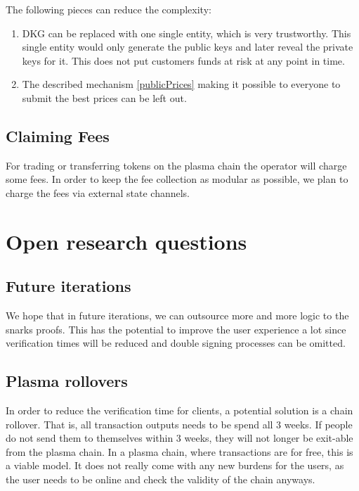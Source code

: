 \documentclass[11pt,parskip=full]{scrartcl}%
\begin{document}
The following pieces can reduce the complexity:
\begin{enumerate}
\item
DKG can be replaced with one single entity, which is very trustworthy. 
This single entity would only generate the public keys and later reveal the private keys for it. 
This does not put customers funds at risk at any point in time. 
\item
The described mechanism \ref{publicPrices} making it possible to everyone to submit the best prices can be left out. 
\end{enumerate}



\subsection{Claiming Fees}
For trading or transferring tokens on the plasma chain the operator will charge some fees. In order to keep the fee collection as modular as possible, we plan to charge the fees via external state channels.

\section{Open research questions}

\subsection{Future iterations}
We hope that in future iterations, we can outsource more and more logic to the snarks proofs. 
This has the potential to improve the user experience a lot since verification times will be reduced and double signing processes can be omitted. 

\subsection{Plasma rollovers}
In order to reduce the verification time for clients, a potential solution is a chain rollover. 
That is, all transaction outputs needs to be spend all 3 weeks. 
If people do not send them to themselves within 3 weeks, they will not longer be exit-able from the plasma chain. 
In a plasma chain, where transactions are for free, this is a viable model. 
It does not really come with any new burdens for the users, as the user needs to be online and check the validity of the chain anyways.
\end{document}
